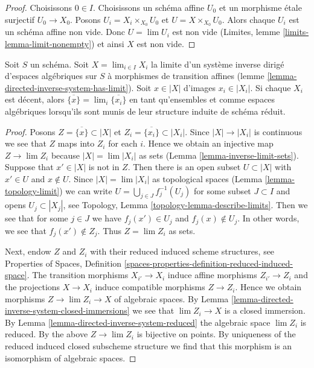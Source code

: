 \begin{proof}
Choisissons $0 \in I$.
Choisissons un schéma affine $U_0$ et un morphisme \'etale surjectif $U_0 \to X_0$.
Posons $U_i = X_i \times_{X_0} U_0$ et $U = X \times_{X_0} U_0$.
Alors chaque $U_i$ est un schéma affine non vide. Donc $U = \lim U_i$
est non vide (Limites, lemme \ref{limits-lemma-limit-nonempty}) et ainsi
$X$ est non vide.
\end{proof}

\begin{lemma}
\label{lemma-inverse-limit-irreducibles}
Soit $S$ un schéma. Soit $X = \lim_{i \in I} X_i$ la limite d'un système
inverse dirigé d'espaces algébriques sur $S$ à morphismes de transition affines
(lemme \ref{lemma-directed-inverse-system-has-limit}).
Soit $x \in |X|$ d'images $x_i \in |X_i|$. Si chaque $X_i$ est décent,
alors $\overline{\{x\}} = \lim_i \overline{\{x_i\}}$ en tant qu'ensembles
et comme espaces algébriques lorsqu'ils sont munis de leur structure induite de schéma réduit.
\end{lemma}

\begin{proof}
Posons $Z = \overline{\{x\}} \subset |X|$ et
$Z_i = \overline{\{x_i\}} \subset |X_i|$.
Since $|X| \to |X_i|$ is continuous we see that $Z$ maps into $Z_i$
for each $i$. Hence we obtain an injective map $Z \to \lim Z_i$
because $|X| = \lim |X_i|$ as sets (Lemma \ref{lemma-inverse-limit-sets}).
Suppose that $x' \in |X|$ is not in $Z$.
Then there is an open subset $U \subset |X|$ with $x' \in U$
and $x \not \in U$. Since
$|X| = \lim |X_i|$ as topological spaces (Lemma \ref{lemma-topology-limit})
we can write $U = \bigcup_{j \in J} f_j^{-1}(U_j)$
for some subset $J \subset I$ and opens $U_j \subset |X_j|$, see
Topology, Lemma \ref{topology-lemma-describe-limits}.
Then we see that for some $j \in J$ we have $f_j(x') \in U_j$
and $f_j(x) \not \in U_j$. In other words, we see that $f_j(x') \not \in Z_j$.
Thus $Z = \lim Z_i$ as sets.

\medskip\noindent
Next, endow $Z$ and $Z_i$ with their reduced induced scheme structures, see
Properties of Spaces, Definition
\ref{spaces-properties-definition-reduced-induced-space}.
The transition morphisms $X_{i'} \to X_i$ induce affine
morphisms $Z_{i'} \to Z_i$ and the projections $X \to X_i$
induce compatible morphisms $Z \to Z_i$.
Hence we obtain morphisms $Z \to \lim Z_i \to X$ of algebraic spaces.
By Lemma \ref{lemma-directed-inverse-system-closed-immersions}
we see that $\lim Z_i \to X$ is a
closed immersion. By Lemma \ref{lemma-directed-inverse-system-reduced}
the algebraic space $\lim Z_i$ is reduced.
By the above $Z \to \lim Z_i$ is bijective on points.
By uniqueness of the reduced induced closed subscheme structure
we find that this morphism is an isomorphism of algebraic spaces.
\end{proof}

